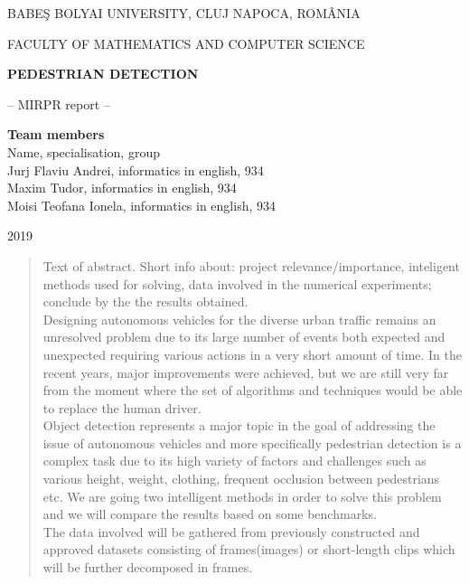\documentclass[runningheads,a4paper,11pt]{report}
\begin{document}
\begin{titlepage}
\sloppy
\begin{center}
BABE\c S BOLYAI UNIVERSITY, CLUJ NAPOCA, ROM\^ ANIA

FACULTY OF MATHEMATICS AND COMPUTER SCIENCE

\vspace{6cm}

\Huge \textbf{PEDESTRIAN DETECTION}

\vspace{1cm}

\normalsize -- MIRPR report --

\end{center}


\vspace{5cm}

\begin{flushright}
\Large{\textbf{Team members}}\\
Name, specialisation, group \\
Jurj Flaviu Andrei, informatics in english, 934 \\
Maxim Tudor, informatics in english, 934 \\
Moisi Teofana Ionela, informatics in english, 934 \\
\end{flushright}

\vspace{4cm}

\begin{center}
2019
\end{center}

\end{titlepage}


\begin{abstract}
	Text of abstract. Short info about: project relevance/importance, inteligent methods used for solving, data involved in the numerical experiments; conclude by the the results obtained. \\

	Designing autonomous vehicles for the diverse urban traffic remains an unresolved problem due to its large number of events both expected and unexpected requiring various actions in a very short amount of time. In the recent years, major improvements were achieved, but we are still very far from the moment where the set of algorithms and techniques would be able to replace the human driver. \\

	Object detection represents a major topic in the goal of addressing the issue of autonomous vehicles and more specifically pedestrian detection is a complex task due to its high variety of factors and challenges such as various height, weight, clothing, frequent occlusion between pedestrians etc. We are going two intelligent methods in order to solve this problem and we will compare the results based on some benchmarks. \\

	The data involved will be gathered from previously constructed and approved datasets consisting of frames(images) or short-length clips which will be further decomposed in frames.
\end{abstract}
\end{document}
